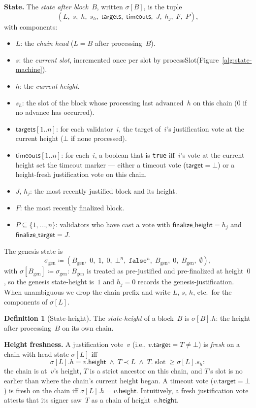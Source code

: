 \documentclass{article}
\newcommand{\genesis}{\ensuremath{B_{\mathrm{gen}}}}
\newcommand{\slot}[0]{\ensuremath{\operatorname{\mathrm{slot}}}}
\newcommand{\target}{\mathsf{target}}
\newcommand{\height}{\mathsf{height}}
\newcommand{\finalizeHeight}{\mathsf{finalize\_height}}
\newcommand{\finalizeTarget}{\mathsf{finalize\_target}}
\newcommand{\targets}{\mathsf{targets}}
\newcommand{\timeouts}{\mathsf{timeouts}}
\newcommand{\processSlot}{\textsf{processSlot}\xspace}
\renewcommand{\paragraph}[1]{\vspace{7pt}\noindent\textbf{#1}}
\theoremstyle{plain}
\theoremstyle{definition}
\newtheorem{definition}{Definition}
\theoremstyle{remark}
\begin{document}
\paragraph{State.}
The \emph{state after block~$B$}, written $\sigma[B]$, is the tuple
\[
  (L,\; s,\; h,\; s_h,\; \targets,\; \timeouts,\; J,\; h_j,\; F,\; P),
\]
with components:
\begin{itemize}
  \item $L$: the \emph{chain head} ($L = B$ after processing~$B$).
  \item $s$: the \emph{current slot}, incremented once per slot by \processSlot (Figure~\ref{alg:state-machine}).
  \item $h$: the \emph{current height}.
  \item $s_h$: the slot of the block whose processing last advanced~$h$ on this chain ($0$ if no advance has occurred).
  \item $\targets[1..n]$: for each validator~$i$, the target of~$i$'s justification vote at the current height ($\bot$ if none processed).
  \item $\timeouts[1..n]$: for each~$i$, a boolean that is \texttt{true} iff~$i$'s vote at the current height set the timeout marker --- either a timeout vote ($\target = \bot$) or a height-fresh justification vote on this chain.
  \item $J$, $h_j$: the most recently justified block and its height.
  \item $F$: the most recently finalized block.
  \item $P \subseteq \{1, \ldots, n\}$: validators who have cast a vote with $\finalizeHeight = h_j$ and $\finalizeTarget = J$.
\end{itemize}
The genesis state is
\[
  \sigma_{\mathrm{gen}} \coloneqq (\genesis,\; 0,\; 1,\; 0,\; \bot^n,\; \mathtt{false}^n,\; \genesis,\; 0,\; \genesis,\; \emptyset),
\]
with $\sigma[\genesis] \coloneqq \sigma_{\mathrm{gen}}$: $\genesis$ is treated as pre-justified and pre-finalized at height~$0$, so the genesis state-height is~$1$ and $h_j = 0$ records the genesis-justification.
When unambiguous we drop the chain prefix and write $L$, $s$, $h$, etc.\ for the components of $\sigma[L]$.

\begin{definition}[State-height]\label{def:sheight}
The \emph{state-height} of a block~$B$ is $\sigma[B].h$: the height after processing~$B$ on its own chain.
\end{definition}

\paragraph{Height freshness.}
A justification vote~$v$ (i.e., $v.\target = T \neq \bot$) is \emph{fresh} on a chain with head state $\sigma[L]$ iff
\[
  \sigma[L].h = v.\height \;\wedge\; T \prec L \;\wedge\; T.\slot \geq \sigma[L].s_h:
\]
the chain is at~$v$'s height, $T$ is a strict ancestor on this chain, and $T$'s slot is no earlier than where the chain's current height began.
A timeout vote ($v.\target = \bot$) is fresh on the chain iff $\sigma[L].h = v.\height$.
Intuitively, a fresh justification vote attests that its signer saw~$T$ as a chain of height~$v.\height$.
\end{document}
